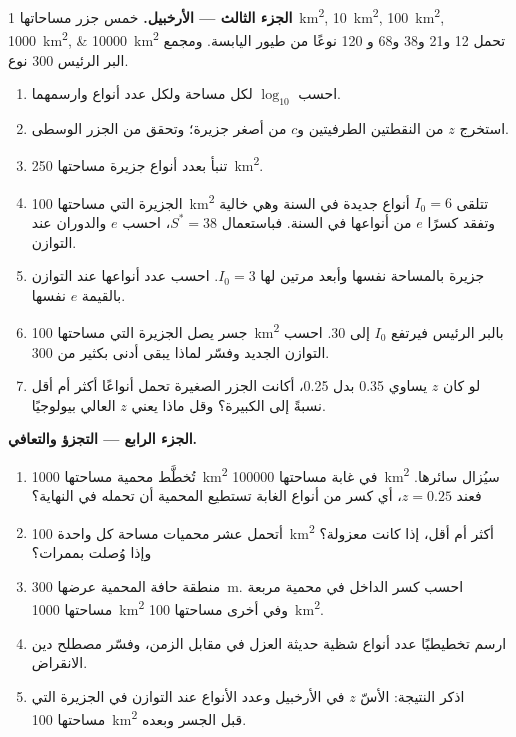 \begin{problem}
\medskip
\noindent\textbf{الجزء الثالث --- الأرخبيل.}
خمس جزر مساحاتها \qtylist{1;10;100;1000;10000}{km^2} تحمل \num{12} و\num{21} و\num{38} و\num{68} و
\num{120} نوعًا من طيور اليابسة. ومجمع البر الرئيس \num{300}
نوع.
\begin{enumerate}[resume]
  \item احسب $\log_{10}$ لكل مساحة ولكل عدد أنواع
        وارسمهما.
  \item استخرج $z$ من النقطتين الطرفيتين و$c$ من أصغر
        جزيرة؛ وتحقق من الجزر الوسطى.
  \item تنبأ بعدد أنواع جزيرة مساحتها \qty{250}{km^2}.
  \item الجزيرة التي مساحتها \qty{100}{km^2} تتلقى $I_0 = 6$ أنواع جديدة في السنة
        وهي خالية وتفقد كسرًا $e$ من أنواعها في السنة.
        فباستعمال $S^* = 38$، احسب $e$ والدوران عند التوازن.
  \item جزيرة بالمساحة نفسها وأبعد مرتين لها $I_0 = 3$.
        احسب عدد أنواعها عند التوازن بالقيمة $e$ نفسها.
  \item جسر يصل الجزيرة التي مساحتها \qty{100}{km^2} بالبر الرئيس
        فيرتفع $I_0$ إلى \num{30}. احسب التوازن الجديد
        وفسّر لماذا يبقى أدنى بكثير من \num{300}.
  \item لو كان $z$ يساوي \num{0.35} بدل \num{0.25}، أكانت الجزر
        الصغيرة تحمل أنواعًا أكثر أم أقل نسبةً إلى الكبيرة؟ وقل
        ماذا يعني $z$ العالي بيولوجيًا.
\end{enumerate}

\medskip
\noindent\textbf{الجزء الرابع --- التجزؤ والتعافي.}
\begin{enumerate}[resume]
  \item تُخطَّط محمية مساحتها \qty{1000}{km^2} في غابة مساحتها
        \qty{100000}{km^2} سيُزال سائرها. فعند $z =
        0.25$، أي كسر من أنواع الغابة تستطيع المحمية أن تحمله
        في النهاية؟
  \item أتحمل عشر محميات مساحة كل واحدة \qty{100}{km^2} أكثر أم أقل، إذا
        كانت معزولة؟ وإذا وُصلت بممرات؟
  \item منطقة حافة المحمية عرضها \qty{300}{m}. احسب كسر
        الداخل في محمية مربعة مساحتها \qty{1000}{km^2} وفي
        أخرى مساحتها \qty{100}{km^2}.
  \item ارسم تخطيطيًا عدد أنواع شظية حديثة العزل
        في مقابل الزمن، وفسّر مصطلح دين الانقراض.
  \item اذكر النتيجة: الأسّ $z$ في الأرخبيل وعدد
        الأنواع عند التوازن في الجزيرة التي مساحتها \qty{100}{km^2}
        قبل الجسر وبعده.
\end{enumerate}
\end{problem}
